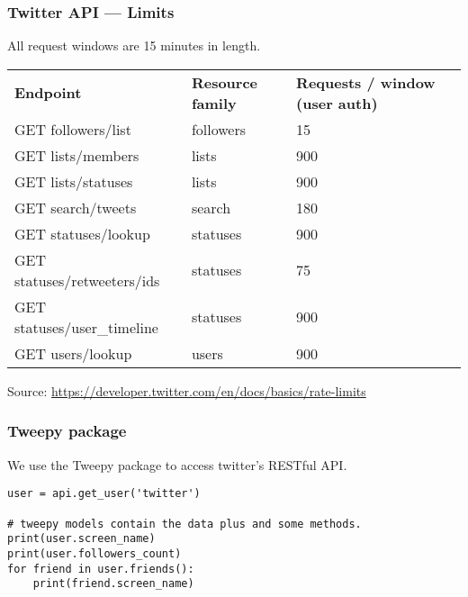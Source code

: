 \begin{frame}
    \frametitle{Twitter API --- Limits}

    All request windows are 15 minutes in length.

    \begin{table}[]
        \footnotesize
        \begin{tabular}{llll}
          \textbf{Endpoint}           & \textbf{Resource family} & \textbf{Requests / window (user auth)} \\
          GET followers/list          & followers                & 15                                     \\
          GET lists/members           & lists                    & 900                                    \\
          GET lists/statuses          & lists                    & 900                                    \\
          GET search/tweets           & search                   & 180                                    \\
          GET statuses/lookup         & statuses                 & 900                                    \\
          GET statuses/retweeters/ids & statuses                 & 75                                     \\
          GET statuses/user\_timeline & statuses                 & 900                                    \\
          GET users/lookup            & users                    & 900                                    \\
        \end{tabular}
    \end{table}

    Source: \href{https://developer.twitter.com/en/docs/basics/rate-limits}{https://developer.twitter.com/en/docs/basics/rate-limits}
\end{frame}

\begin{frame}[fragile]
    \frametitle{Tweepy package}

    We use the Tweepy package to access twitter's RESTful API.

\begin{verbatim}
user = api.get_user('twitter')

# tweepy models contain the data plus and some methods.
print(user.screen_name)
print(user.followers_count)
for friend in user.friends():
    print(friend.screen_name)
\end{verbatim}

\end{frame}

